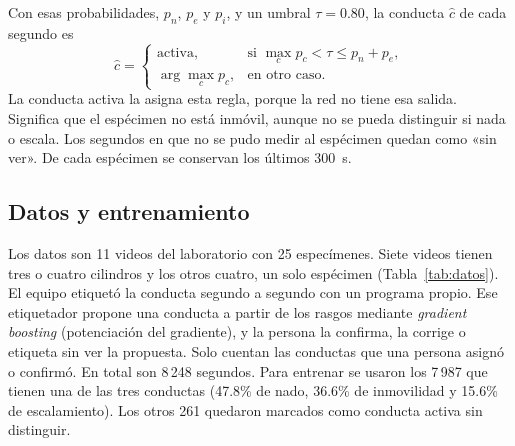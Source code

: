 \documentclass[conference,letterpaper]{IEEEtran}
\begin{document}
Con esas probabilidades, $p_n$, $p_e$ y $p_i$, y un umbral $\tau=0.80$, la conducta
$\hat{c}$ de cada segundo es
\begin{equation}
\hat{c}=
\begin{cases}
\text{activa}, & \text{si } \max_c p_c<\tau\le p_n+p_e,\\
\arg\max_c p_c, & \text{en otro caso.}
\end{cases}
\label{eq:regla}
\end{equation}
La conducta activa la asigna esta regla, porque la red no tiene esa salida. Significa que el
espécimen no está inmóvil, aunque no se pueda distinguir si nada o escala. Los segundos en
que no se pudo medir al espécimen quedan como «sin ver». De cada espécimen se conservan los
últimos 300~s.

\subsection{Datos y entrenamiento}

Los datos son 11 videos del laboratorio con 25 especímenes. Siete videos tienen tres o
cuatro cilindros y los otros cuatro, un solo espécimen (Tabla~\ref{tab:datos}). El equipo
etiquetó la conducta segundo a segundo con un programa propio. Ese etiquetador propone una
conducta a partir de los rasgos mediante \textit{gradient boosting} (potenciación del
gradiente), y la persona la confirma, la corrige o etiqueta sin ver la propuesta. Solo
cuentan las conductas que una persona asignó o confirmó. En total son 8\,248 segundos. Para
entrenar se usaron los 7\,987 que tienen una de las tres conductas (47.8\% de nado, 36.6\%
de inmovilidad y 15.6\% de escalamiento). Los otros 261 quedaron marcados como conducta
activa sin distinguir.
\end{document}
